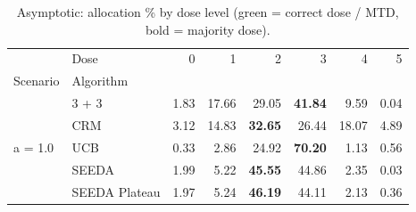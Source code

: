 \begin{table}[H]
\centering
\caption{Asymptotic: allocation \% by dose level (green = correct dose / MTD, bold = majority dose).}
\label{tab:asym_alloc_by_dose}
\begin{tabular}{llrrrrrr}
\toprule
 & Dose & 0 & 1 & 2 & 3 & 4 & 5 \\
Scenario & Algorithm &  &  &  &  &  &  \\
\midrule
\multirow[c]{5}{*}{a = 1.0} & 3 + 3 & 1.83 & 17.66 & {\cellcolor[HTML]{C8E6C9}} 29.05 & \bfseries 41.84 & 9.59 & 0.04 \\
 & CRM & 3.12 & 14.83 & {\cellcolor[HTML]{C8E6C9}} \bfseries 32.65 & 26.44 & 18.07 & 4.89 \\
 & UCB & 0.33 & 2.86 & {\cellcolor[HTML]{C8E6C9}} 24.92 & \bfseries 70.20 & 1.13 & 0.56 \\
 & SEEDA & 1.99 & 5.22 & {\cellcolor[HTML]{C8E6C9}} \bfseries 45.55 & 44.86 & 2.35 & 0.03 \\
 & SEEDA Plateau & 1.97 & 5.24 & {\cellcolor[HTML]{C8E6C9}} \bfseries 46.19 & 44.11 & 2.13 & 0.36 \\
\bottomrule
\end{tabular}
\end{table}
